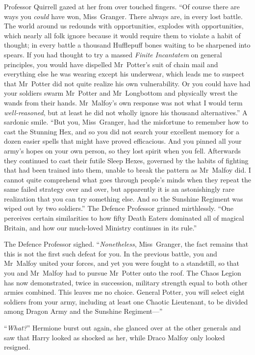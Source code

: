 Professor Quirrell gazed at her from over touched fingers. “Of course there are ways you \emph{could} have won, Miss~Granger. There always are, in every lost battle. The world around us redounds with opportunities, explodes with opportunities, which nearly all folk ignore because it would require them to violate a habit of thought; in every battle a thousand Hufflepuff bones waiting to be sharpened into spears. If you had thought to try a massed \emph{Finite Incantatem} on general principles, you would have dispelled Mr~Potter’s suit of chain mail and everything else he was wearing except his underwear, which leads me to suspect that Mr~Potter did not quite realize his own vulnerability. Or you could have had your soldiers swarm Mr~Potter and Mr~Longbottom and physically wrest the wands from their hands. Mr~Malfoy’s own response was not what I would term \emph{well-reasoned}, but at least he did not wholly ignore his thousand alternatives.” A sardonic smile. “But you, Miss~Granger, had the misfortune to remember how to cast the Stunning Hex, and so you did not search your excellent memory for a dozen easier spells that might have proved efficacious. And you pinned all your army’s hopes on your own person, so they lost spirit when you fell. Afterwards they continued to cast their futile Sleep Hexes, governed by the habits of fighting that had been trained into them, unable to break the pattern as Mr~Malfoy did. I cannot quite comprehend what goes through people’s minds when they repeat the same failed strategy over and over, but apparently it is an astonishingly rare realization that you can try something else. And so the Sunshine Regiment was wiped out by two soldiers.” The Defence Professor grinned mirthlessly. “One perceives certain similarities to how fifty Death Eaters dominated all of magical Britain, and how our much-loved Ministry continues in its rule.”

The Defence Professor sighed. “\emph{Nonetheless}, Miss~Granger, the fact remains that this is not the first such defeat for you. In the previous battle, you and Mr~Malfoy united your forces, and yet you were fought to a standstill, so that you and Mr~Malfoy had to pursue Mr~Potter onto the roof. The Chaos Legion has now demonstrated, twice in succession, military strength equal to both other armies combined. This leaves me no choice. General Potter, you will select eight soldiers from your army, including at least one Chaotic Lieutenant, to be divided among Dragon Army and the Sunshine Regiment—”

“\emph{What?}” Hermione burst out again, she glanced over at the other generals and saw that Harry looked as shocked as her, while Draco Malfoy only looked resigned.

